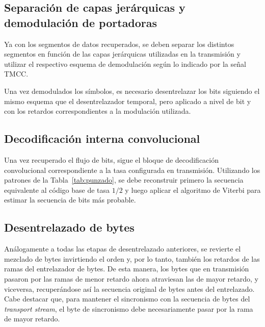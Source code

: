 
\subsection{Separación de capas jerárquicas y demodulación de portadoras}

Ya con los segmentos de datos recuperados, se deben separar los distintos segmentos en función de las capas jerárquicas utilizadas en la transmisión y utilizar el respectivo esquema de demodulación según lo indicado por la señal TMCC.

Una vez demodulados los símbolos, es necesario desentrelazar los bits siguiendo el mismo esquema que el desentrelazador temporal, pero aplicado a nivel de bit y con los retardos correspondientes a la modulación utilizada.


\subsection{Decodificación interna convolucional}

Una vez recuperado el flujo de bits, sigue el bloque de decodificación convolucional correspondiente a la tasa configurada en transmisión. Utilizando los patrones de la Tabla~\ref{tab:punzado}, se debe reconstruir primero la secuencia equivalente al código base de tasa \(1/2\) y luego aplicar el algoritmo de Viterbi para estimar la secuencia de bits más probable.

\subsection{Desentrelazado de bytes}

Análogamente a todas las etapas de desentrelazado anteriores, se revierte el mezclado de bytes invirtiendo el orden y, por lo tanto, también los retardos de las ramas del entrelazador de bytes. De esta manera, los bytes que en transmisión pasaron por las ramas de menor retardo ahora atraviesan las de mayor retardo, y viceversa, recuperándose así la secuencia original de bytes antes del entrelazado. Cabe destacar que, para mantener el sincronismo con la secuencia de bytes del \textit{transport stream}, el byte de sincronismo debe necesariamente pasar por la rama de mayor retardo.

